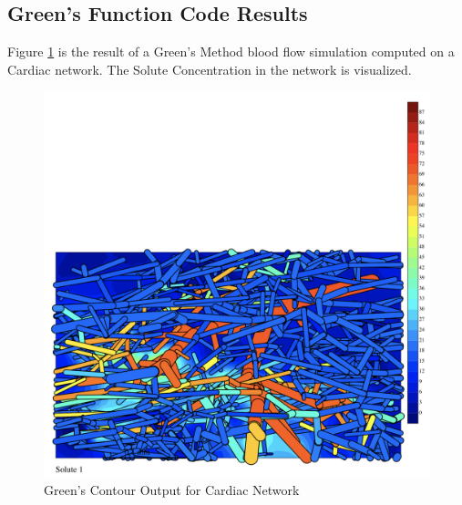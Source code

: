 \subsection{Green's Function Code Results}

Figure \ref{fig:Contour_Cardiac}  is the result of a Green's Method blood flow simulation computed on a Cardiac network. The Solute Concentration in the network is visualized.\\
\begin{figure}[h]
\centering
\includegraphics[width=170mm]{Contour_Cardiac}
\caption{Green's Contour Output for Cardiac Network}
\label{fig:Contour_Cardiac}
\end{figure}